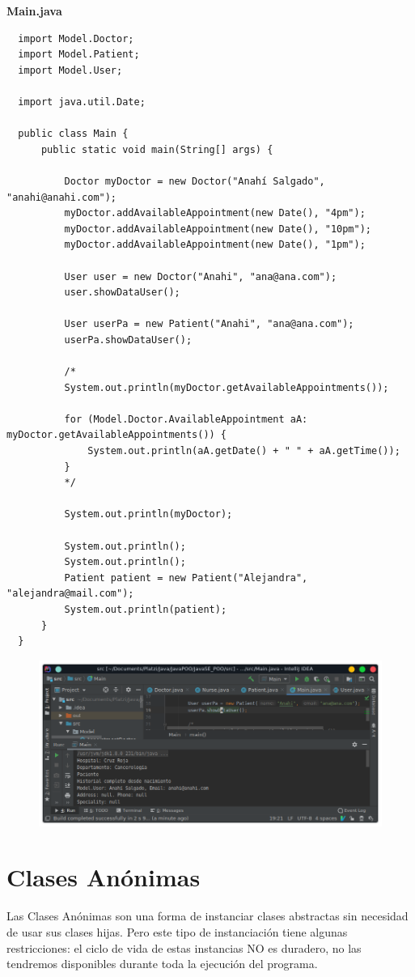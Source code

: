 \documentclass{article}
\begin{document}
\textbf{Main.java}
\begin{verbatim}
  import Model.Doctor;
  import Model.Patient;
  import Model.User;

  import java.util.Date;

  public class Main {
      public static void main(String[] args) {

          Doctor myDoctor = new Doctor("Anahí Salgado", "anahi@anahi.com");
          myDoctor.addAvailableAppointment(new Date(), "4pm");
          myDoctor.addAvailableAppointment(new Date(), "10pm");
          myDoctor.addAvailableAppointment(new Date(), "1pm");

          User user = new Doctor("Anahi", "ana@ana.com");
          user.showDataUser();

          User userPa = new Patient("Anahi", "ana@ana.com");
          userPa.showDataUser();

          /*
          System.out.println(myDoctor.getAvailableAppointments());

          for (Model.Doctor.AvailableAppointment aA: myDoctor.getAvailableAppointments()) {
              System.out.println(aA.getDate() + " " + aA.getTime());
          }
          */

          System.out.println(myDoctor);

          System.out.println();
          System.out.println();
          Patient patient = new Patient("Alejandra", "alejandra@mail.com");
          System.out.println(patient);
      }
  }
\end{verbatim}

\begin{figure}[h!]
  \centering
  \includegraphics[scale=0.5]{./Pictures/050_polimorfismo_abstracto.png}
\end{figure}


\section{Clases Anónimas}%
Las Clases Anónimas son una forma de instanciar clases abstractas sin necesidad
de usar sus clases hijas. Pero este tipo de instanciación tiene algunas
restricciones: el ciclo de vida de estas instancias NO es duradero, no las
tendremos disponibles durante toda la ejecución del programa.
\end{document}
